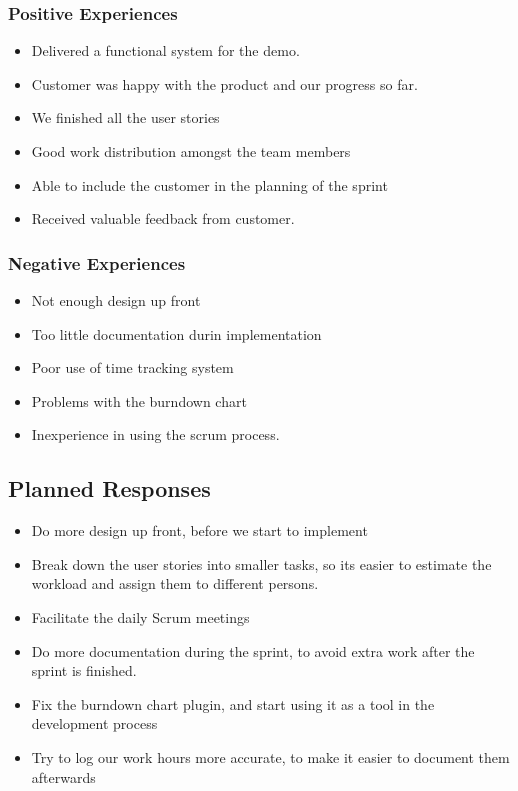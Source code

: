 \subsubsection{Positive Experiences}

\begin{itemize}
\item Delivered a functional system for the demo.
\item Customer was happy with the product and our progress so far.
\item We finished all the user stories
\item Good work distribution amongst the team members
\item Able to include the customer in the planning of the sprint
\item Received valuable feedback from customer.
\end{itemize}

\subsubsection{Negative Experiences}
\begin{itemize}
\item Not enough design up front
\item Too little documentation durin implementation 
\item Poor use of time tracking system
\item Problems with the burndown chart
\item Inexperience in using the scrum process.
\end{itemize}

\subsection{Planned Responses}
\begin{itemize}
\item Do more design up front, before we start to implement
\item Break down the user stories into smaller tasks, so its easier to estimate the workload and assign them to different persons.
\item Facilitate the daily Scrum meetings
\item Do more documentation during the sprint, to avoid extra work after the sprint is finished.
\item Fix the burndown chart plugin, and start using it as a tool in the development process
\item Try to log our work hours more accurate, to make it easier to document them afterwards
\end{itemize}
